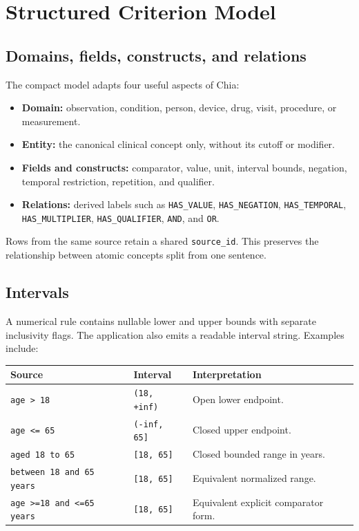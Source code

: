 \documentclass[11pt]{article}
\newcommand{\code}[1]{\nolinkurl{#1}}
\begin{document}
\section{Structured Criterion Model}

\subsection{Domains, fields, constructs, and relations}

The compact model adapts four useful aspects of Chia:

\begin{itemize}
  \item \textbf{Domain:} observation, condition, person, device, drug, visit, procedure, or measurement.
  \item \textbf{Entity:} the canonical clinical concept only, without its cutoff or modifier.
  \item \textbf{Fields and constructs:} comparator, value, unit, interval bounds, negation, temporal restriction, repetition, and qualifier.
  \item \textbf{Relations:} derived labels such as \code{HAS_VALUE}, \code{HAS_NEGATION}, \code{HAS_TEMPORAL}, \code{HAS_MULTIPLIER}, \code{HAS_QUALIFIER}, \code{AND}, and \code{OR}.
\end{itemize}

Rows from the same source retain a shared \code{source_id}. This preserves the relationship between atomic concepts split from one sentence.

\subsection{Intervals}

A numerical rule contains nullable lower and upper bounds with separate inclusivity flags. The application also emits a readable interval string. Examples include:

\begin{longtable}{p{}p{}p{}}
\toprule
Source & Interval & Interpretation \\
\midrule
\endhead
\code{age > 18} & \code{(18, +inf)} & Open lower endpoint. \\
\code{age <= 65} & \code{(-inf, 65]} & Closed upper endpoint. \\
\code{aged 18 to 65} & \code{[18, 65]} & Closed bounded range in years. \\
\code{between 18 and 65 years} & \code{[18, 65]} & Equivalent normalized range. \\
\code{age >=18 and <=65 years} & \code{[18, 65]} & Equivalent explicit comparator form. \\
\bottomrule
\end{longtable}
\end{document}
